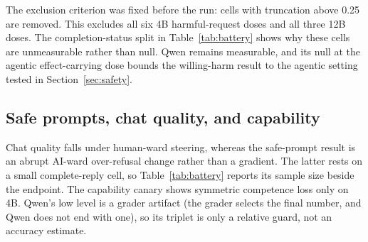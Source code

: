 The exclusion criterion was fixed before the run: cells with truncation above
0.25 are removed. This excludes all six 4B harmful-request doses and all three
12B doses. The completion-status split in Table~\ref{tab:battery} shows why
these cells are unmeasurable rather than null. Qwen remains measurable, and its
null at the agentic effect-carrying dose bounds the willing-harm result to the
agentic setting tested in Section~\ref{sec:safety}.

\subsection{Safe prompts, chat quality, and capability}

Chat quality falls under human-ward steering, whereas the safe-prompt result is
an abrupt AI-ward over-refusal change rather than a gradient. The latter rests
on a small complete-reply cell, so Table~\ref{tab:battery} reports its sample size
beside the endpoint. The capability canary shows symmetric competence loss only
on 4B. Qwen's low level is a grader artifact (the grader selects the final
number, and Qwen does not end with one), so its triplet is only a relative
guard, not an accuracy estimate.

